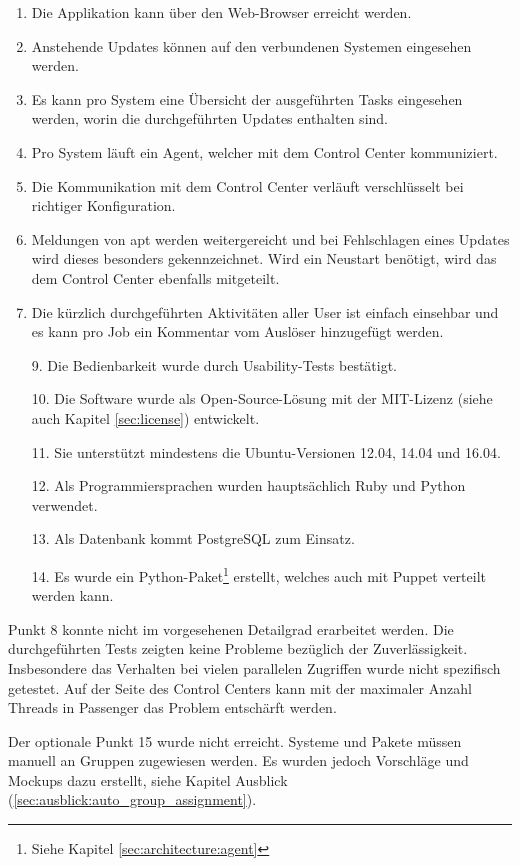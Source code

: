 \begin{enumerate}[noitemsep]
    \item Die Applikation kann über den Web-Browser erreicht werden.
    \item Anstehende Updates können auf den verbundenen Systemen eingesehen werden.
    \item Es kann pro System eine Übersicht der ausgeführten Tasks eingesehen werden, worin die durchgeführten Updates enthalten sind.
    \item Pro System läuft ein Agent, welcher mit dem Control Center kommuniziert.
    \item Die Kommunikation mit dem Control Center verläuft verschlüsselt bei richtiger Konfiguration.
    \item Meldungen von \gls{apt} werden weitergereicht und bei Fehlschlagen eines Updates wird dieses besonders gekennzeichnet. Wird ein Neustart benötigt, wird das dem Control Center ebenfalls mitgeteilt.
    \item Die kürzlich durchgeführten Aktivitäten aller User ist einfach einsehbar und es kann pro Job ein Kommentar vom Auslöser hinzugefügt werden.
    \item [9.] Die Bedienbarkeit wurde durch Usability-Tests bestätigt.
    \item [10.] Die Software wurde als Open-Source-Lösung mit der MIT-Lizenz (siehe auch Kapitel \ref{sec:license}) entwickelt.
    \item [11.] Sie unterstützt mindestens die Ubuntu-Versionen 12.04, 14.04 und 16.04.
    \item [12.] Als Programmiersprachen wurden hauptsächlich Ruby und Python verwendet.
    \item [13.] Als Datenbank kommt PostgreSQL zum Einsatz.
    \item [14.] Es wurde ein Python-Paket\footnote{Siehe Kapitel \ref{sec:architecture:agent}} erstellt, welches auch mit Puppet verteilt werden kann.
\end{enumerate}

Punkt 8 konnte nicht im vorgesehenen Detailgrad erarbeitet werden. Die durchgeführten Tests zeigten keine Probleme bezüglich der Zuverlässigkeit. Insbesondere das Verhalten bei vielen parallelen Zugriffen wurde nicht spezifisch getestet. Auf der Seite des Control Centers kann mit der maximaler Anzahl Threads in Passenger das Problem entschärft werden.

\xxx[mehr?]

Der optionale Punkt 15 wurde nicht erreicht. Systeme und Pakete müssen manuell an Gruppen zugewiesen werden. Es wurden jedoch Vorschläge und Mockups dazu erstellt, siehe Kapitel Ausblick (\ref{sec:ausblick:auto_group_assignment}).

